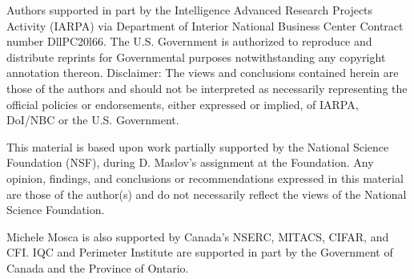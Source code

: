 \documentclass[english,journal]{extarticle}
\theoremstyle{plain}
\theoremstyle{plain}
\theoremstyle{plain}
\theoremstyle{definition}
\theoremstyle{plain}
\theoremstyle{plain}
\begin{document}
Authors supported in part by the Intelligence Advanced Research Projects
Activity (IARPA) via Department of Interior National Business Center
Contract number DllPC20l66. The U.S. Government is authorized to reproduce
and distribute reprints for Governmental purposes notwithstanding
any copyright annotation thereon. Disclaimer: The views and conclusions
contained herein are those of the authors and should not be interpreted
as necessarily representing the official policies or endorsements,
either expressed or implied, of IARPA, DoI/NBC or the U.S. Government.

This material is based upon work partially supported by the National Science Foundation (NSF), during D. Maslov's assignment at the Foundation.
Any opinion, findings, and conclusions or recommendations expressed in this material are those of the author(s) and do not necessarily reflect the views of the National Science Foundation.

Michele Mosca is also supported by Canada's NSERC, MITACS, CIFAR, and CFI.
IQC and Perimeter Institute are supported in part by the Government of Canada
and the Province of Ontario.
\end{document}
